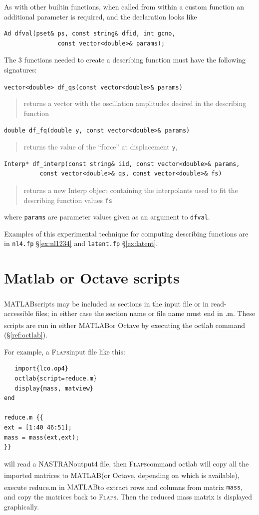 \documentclass[11pt,openany,twoside]{book}
\numberwithin{equation}{section}		%
\newcommand{\Cmd}[1]{{\sf #1}}
\newcommand{\Code}[1]{{\small\tt #1}}
\newcommand{\Flaps}{\textsc{Flaps\:}}
\newcommand{\Matlab}{{\footnotesize{MATLAB\textsuperscript{\textregistered}}\:}}
\newcommand{\Octlab}{\Cmd{matlab}/\Cmd{octave}\:}
\newcommand{\Nastran}{{\footnotesize{NASTRAN\:}}}
\newcommand{\Sectref}[1]{\S\ref{#1}}
\begin{document}
As with other builtin functions, when called from within a custom
function an additional parameter is required, and the declaration looks
like
\begin{lstlisting}
Ad dfval(pset& ps, const string& dfid, int gcno,
               const vector<double>& params);
\end{lstlisting}

The 3 functions needed to create a describing function
must have the following signatures:
\vspace{0.5em}

\verb!vector<double> df_qs(const vector<double>& params)!
\vspace{-.5em}
\begin{quote}
returns a vector with the oscillation amplitudes desired in the describing function
\end{quote}
\verb!double df_fq(double y, const vector<double>& params)!
\vspace{-.5em}
\begin{quote}
returns the value of the ``force'' at displacement \Code{y},
\end{quote}
\begin{lstlisting}
Interp* df_interp(const string& iid, const vector<double>& params,
          const vector<double>& qs, const vector<double>& fs)
\end{lstlisting}
\vspace{-1.5em}
\begin{quote}
returns a new Interp object containing the interpolants used to fit the
describing function values \Code{fs}
\end{quote}
where \Code{params} are parameter values given as an argument to \Code{dfval}.

Examples of this experimental technique for computing describing
functions are in \Code{nl4.fp} \Sectref{ex:nl1234} and \Code{latent.fp}
\Sectref{ex:latent}.

\section{Matlab or Octave scripts}
\index{matlab@\Octlab!scripts}
\Matlab scripts may be included as sections in the input file or
in read-accessible files; in either case the section name or file
name must end in .m. These scripts are run in either \Matlab or
Octave by executing the \Cmd{octlab} command (\Sectref{ref:octlab}).

For example, a \Flaps input file like this:
\begin{lstlisting}
   import{lco.op4}
   octlab{script=reduce.m}
   display{mass, matview}
end

reduce.m {{
ext = [1:40 46:51];
mass = mass(ext,ext);
}}
\end{lstlisting}
will read a \Nastran output4 file,
then \Flaps command \Cmd{octlab} will copy all the imported matrices
to \Matlab (or Octave, depending on which is available), execute
reduce.m in \Matlab to extract rows and columns from matrix \Code{mass},
and copy the matrices back
to \Flaps. Then the reduced mass matrix is displayed graphically.
\end{document}
